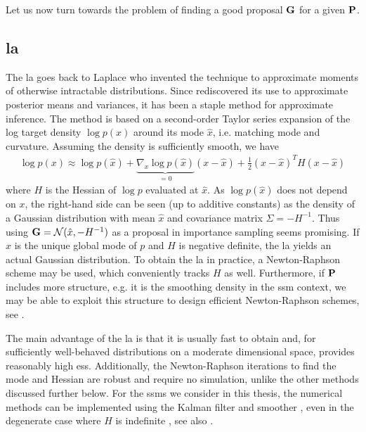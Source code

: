 Let us now turn towards the problem of finding a good proposal $\G$ for a given $\P$. 

\subsection{\texorpdfstring{\Acrfull{la}}{Laplace approximation}}
\label{subsec:la}

The \acrfull{la} goes back to Laplace \citep{Laplace1986Memoir} who invented the technique to approximate moments of otherwise intractable distributions. Since \citep{Tierney1986Accurate,Tierney1989Fully} rediscovered its use to approximate posterior means and variances, it has been a staple method for approximate inference.
The method is based on a second-order Taylor series expansion of the log target density $\log p(x)$ around its mode $\hat x$, i.e. matching mode and curvature. Assuming the density is sufficiently smooth, we have
\begin{align}
    \label{eq:LA_approximation}
\log p(x) \approx \log p(\hat x) + \underbrace{\nabla_{x} \log p (\hat x)}_{= 0} \left( x - \hat x \right) + \frac{1}{2} (x - \hat x)^{T} H (x - \hat x)
\end{align}
where $H$ is the Hessian of $\log p$ evaluated at $\hat x$. As $\log p (\hat x)$ does not depend on $x$, the right-hand side can be seen (up to additive constants) as the density of a Gaussian distribution with mean $\hat x$ and covariance matrix $\Sigma = - H^{-1}$. Thus using $\G = \mathcal N (\hat x, -H^{-1})$ as a proposal in importance sampling seems promising. 
If $\hat x$ is the unique global mode of $p$ and $H$ is negative definite, the \gls{la} yields an actual Gaussian distribution. 
To obtain the \acrshort{la} in practice, a Newton-Raphson scheme may be used, which conveniently tracks $H$ as well. Furthermore, if $\P$ includes more structure, e.g. it is the smoothing density in the \acrshort{ssm} context, we may be able to exploit this structure to design efficient Newton-Raphson schemes, see .

The main advantage of the \gls{la} is that it is usually fast to obtain and, for sufficiently well-behaved distributions on a moderate dimensional space, provides reasonably high \gls{ess}. Additionally, the Newton-Raphson iterations to find the mode and Hessian are robust and require no simulation, unlike the other methods discussed further below.
For the \glspl{ssm} we consider in this thesis, the numerical methods can be implemented using the Kalman filter and smoother \citep{Shephard1997Likelihood,Durbin1997Monte}, even in the degenerate case where $H$ is indefinite \citep{Jungbacker2007Monte}, see also .

